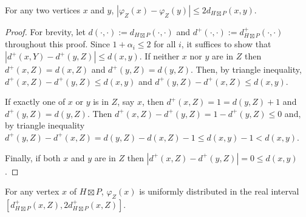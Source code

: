 \documentclass{patmorin}
\renewcommand{\le}{\leqslant}
\begin{document}
\begin{lem}\label{double_distance}
  For any two vertices $x$ and $y$, $|\varphi_Z(x)-\varphi_Z(y)|\le 2d_{H\boxtimes P}(x,y)$.
\end{lem}

\begin{proof}
  For brevity, let $d(\cdot,\cdot):=d_{H\boxtimes P}(\cdot,\cdot)$ and $d^+(\cdot,\cdot):=d^+_{H\boxtimes P}(\cdot,\cdot)$ throughout this proof.
  Since $1+\alpha_i\le 2$ for all $i$, it suffices to show that $|d^+(x,Y)-d^+(y,Z)|\le d(x,y)$.  If neither $x$ nor $y$ are in $Z$ then $d^+(x,Z)=d(x,Z)$ and $d^+(y,Z)=d(y,Z)$.  Then, by triangle inequality, $d^+(x,Z)-d^+(y,Z)\le d(x,y)$ and $d^+(y,Z)-d^+(x,Z)\le d(x,y)$.

  If exactly one of $x$ or $y$ is in $Z$, say $x$, then $d^+(x,Z)=1=d(y,Z)+1$ and $d^+(y,Z)=d(y,Z)$.  Then $d^+(x,Z)-d^+(y,Z)=1-d^+(y,Z)\le 0$ and, by triangle inequality $d^+(y,Z)-d^+(x,Z)=d(y,Z)-d(x,Z)-1 \le d(x,y)-1< d(x,y)$.

  Finally, if both $x$ and $y$ are in $Z$ then $|d^+(x,Z)-d^+(y,Z)|=0\le d(x,y)$.
\end{proof}


\begin{obs}\label{uniform}
  For any vertex $x$ of $H\boxtimes P$, $\varphi_Z(x)$ is uniformly distributed in the real interval $[d^+_{H\boxtimes P}(x,Z), 2d^+_{H\boxtimes P}(x,Z)]$.
\end{obs}

\end{document}

